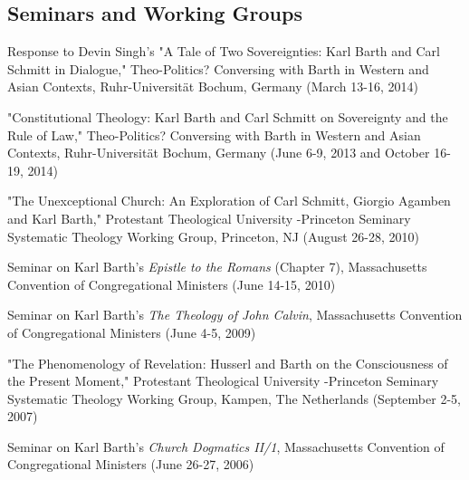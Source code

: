 \documentclass[10pt]{res} %
\begin{document}
\begin{resume}
\section{Seminars and Working Groups}

\begin{hangparas}{.25in}{1}Response to Devin Singh’s "A Tale of Two Sovereignties: Karl Barth and Carl Schmitt in Dialogue," Theo-Politics? Conversing with Barth in Western and Asian Contexts, Ruhr-Universität Bochum, Germany (March 13-16, 2014)\end{hangparas}

\begin{hangparas}{.25in}{1}"Constitutional Theology: Karl Barth and Carl Schmitt on Sovereignty and the Rule of Law," Theo-Politics? Conversing with Barth in Western and Asian Contexts, Ruhr-Universität Bochum, Germany (June 6-9, 2013 and October 16-19, 2014)\end{hangparas}

\begin{hangparas}{.25in}{1}"The Unexceptional Church: An Exploration of Carl Schmitt, Giorgio Agamben and Karl Barth," Protestant Theological University -Princeton Seminary Systematic Theology Working Group, Princeton, NJ (August 26-28, 2010)\end{hangparas}

\begin{hangparas}{.25in}{1}Seminar on Karl Barth’s \textit{Epistle to the Romans} (Chapter 7), Massachusetts Convention of Congregational Ministers (June 14-15, 2010)\end{hangparas}

\begin{hangparas}{.25in}{1}Seminar on Karl Barth’s \textit{The Theology of John Calvin}, Massachusetts Convention of Congregational Ministers (June 4-5, 2009)\end{hangparas}

\begin{hangparas}{.25in}{1}"The Phenomenology of Revelation: Husserl and Barth on the Consciousness of the Present Moment," Protestant Theological University -Princeton Seminary Systematic Theology Working Group, Kampen, The Netherlands (September 2-5, 2007)\end{hangparas}

\begin{hangparas}{.25in}{1}Seminar on Karl Barth’s \textit{Church Dogmatics II/1}, Massachusetts Convention of Congregational Ministers (June 26-27, 2006)\end{hangparas}


\end{resume}
\end{document}
